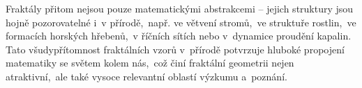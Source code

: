 Fraktály přitom nejsou pouze matematickými abstrakcemi -- jejich struktury jsou hojně pozorovatelné i~v přírodě,~např. ve větvení stromů,~ve struktuře rostlin,~ve formacích horských hřebenů,~v říčních sítích nebo v~dynamice proudění kapalin. Tato všudypřítomnost fraktálních vzorů v~přírodě potvrzuje hluboké propojení matematiky se světem kolem nás,~což činí fraktální geometrii nejen atraktivní,~ale také vysoce relevantní oblastí výzkumu a~poznání.